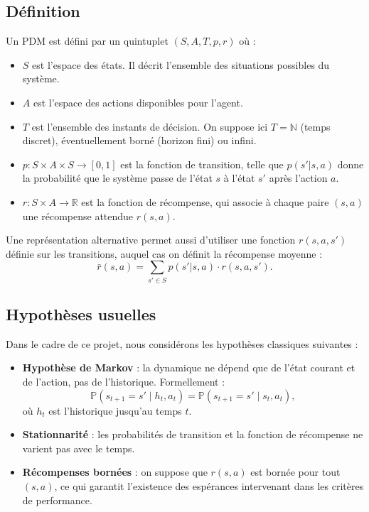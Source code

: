 \documentclass[12pt]{article}
\begin{document}
\subsection{Définition}

Un PDM est défini par un quintuplet \((S, A, T, p, r)\) où :
\begin{itemize}
    \item \(S\) est l’espace des états. Il décrit l’ensemble des situations possibles du système.
    \item \(A\) est l’espace des actions disponibles pour l’agent.
    \item \(T\) est l’ensemble des instants de décision. On suppose ici \(T = \mathbb{N}\) (temps discret), éventuellement borné (horizon fini) ou infini.
    \item \(p : S \times A \times S \rightarrow [0,1]\) est la fonction de transition, telle que \(p(s'|s,a)\) donne la probabilité que le système passe de l’état \(s\) à l’état \(s'\) après l’action \(a\).
    \item \(r : S \times A \rightarrow \mathbb{R}\) est la fonction de récompense, qui associe à chaque paire \((s,a)\) une récompense attendue \(r(s,a)\).
\end{itemize}

Une représentation alternative permet aussi d’utiliser une fonction \(r(s, a, s')\) définie sur les transitions, auquel cas on définit la récompense moyenne :
\[
\bar{r}(s, a) = \sum_{s' \in S} p(s'|s,a) \cdot r(s,a,s').
\]

\subsection{Hypothèses usuelles}

Dans le cadre de ce projet, nous considérons les hypothèses classiques suivantes :
\begin{itemize}
    \item \textbf{Hypothèse de Markov} : la dynamique ne dépend que de l’état courant et de l’action, pas de l’historique. Formellement :
    \[
    \mathbb{P}(s_{t+1} = s' \mid h_t, a_t) = \mathbb{P}(s_{t+1} = s' \mid s_t, a_t),
    \]
    où \(h_t\) est l’historique jusqu’au temps \(t\).
\vspace{0.5em}
    \item \textbf{Stationnarité} : les probabilités de transition et la fonction de récompense ne varient pas avec le temps.
\vspace{0.5em}
    \item \textbf{Récompenses bornées} : on suppose que \(r(s,a)\) est bornée pour tout \((s,a)\), ce qui garantit l’existence des espérances intervenant dans les critères de performance.
\end{itemize}
\end{document}
